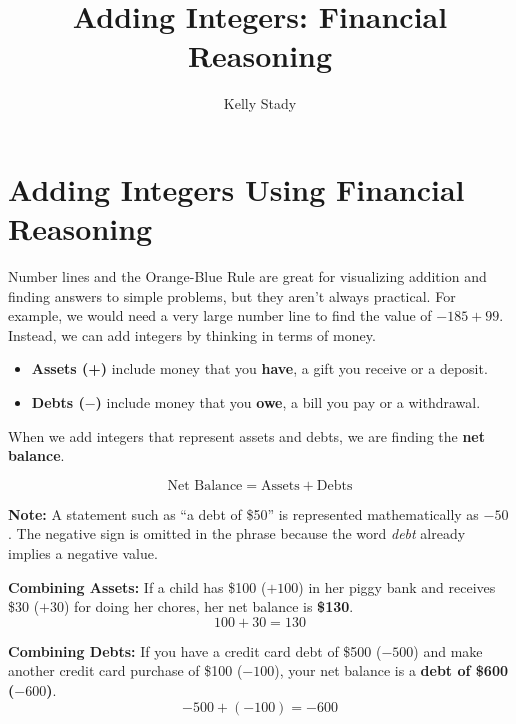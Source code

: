 \documentclass{ximera}[font=12pt]
\title{Adding Integers: Financial Reasoning}   %
\author{Kelly Stady}
\begin{document}
\begin{abstract}

\end{abstract}

\maketitle
\label{xim:AddIntMoneyActivity}


\section*{Adding Integers Using Financial Reasoning}

Number lines and the Orange-Blue Rule are great for visualizing addition and finding answers to simple problems, but they aren't always practical. For example, we would need a very large number line to find the value of $-185 + 99.$  Instead, we can add integers by thinking in terms of money.


\begin{itemize}
\item \textbf{Assets (+)} include money that you \textbf{have}, a gift you receive or a deposit.

\item \textbf{Debts ($-$)} include money that you \textbf{owe}, a bill you pay or a withdrawal.

\end{itemize}


When we add integers that represent assets and debts, we are finding the \textbf{net balance}.

\[ \textrm{Net Balance} = \textrm{Assets} + \textrm{Debts} \]


\textbf{Note:} A statement such as ``a debt of \$50'' is represented mathematically as $-50$. The negative sign is omitted in the phrase because the word \emph{debt} already implies a negative value.



\begin{example}
    \textbf{Combining Assets:} If a child has \$100 ($+100$) in her piggy bank and receives \$30 ($+30$) for doing her chores, her net 
     balance is \textbf{\$130}.
    \[ 100 + 30 = 130 \]
\end{example}

\begin{example}
    \textbf{Combining Debts:} If you have a credit card debt of \$500 ($-500$) and make another credit card purchase of 
    \$100 ($-100$), your net balance is a \textbf{debt of \$600 ($-600$)}.
    \[ -500 + (-100) = -600 \]
\end{example}
\end{document}
